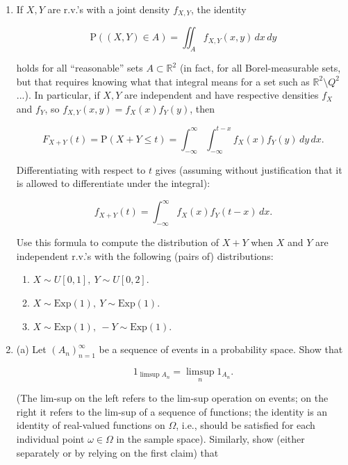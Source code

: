 \documentclass[11pt]{report}
\newcommand{\R}{\mathbb{R}}
\theoremstyle{plain}
\theoremstyle{definition}
\begin{document}
\begin{enumerate}[label=\arabic*.]
(c) Let $X_1, X_2, \ldots$ be a sequence of
independent r.v.'s, all of them having distribution
$\textrm{Exp}(1)$. For each $n\ge1$ denote

\[
M_n = \max(X_1,X_2,\ldots,X_n) - \log n.
\]

\noindent Compute for each $n$ the distribution function of
$M_n$, and find the limit (if it exists)

\[
F(x) = \lim_{n\to\infty} F_{M_n}(x).
\]

\item If $X,Y$ are r.v.'s with a joint density $f_{X,Y}$,
the identity

\[
\mathrm{P}((X,Y) \in A) = \iint_A f_{X,Y}(x,y)\,dx\,dy
\]

\noindent holds for all ``reasonable'' sets $A\subset \R^2$ (in
fact, for all Borel-measurable sets, but that requires
knowing what that integral means for a set such as
$\R^2\setminus Q^2$...). In particular, if $X,Y$ are
independent and have respective densities $f_X$ and
$f_Y$, so $f_{X,Y}(x,y)=f_X(x)f_Y(y)$, then

\[
F_{X+Y}(t) = \mathrm{P}(X+Y \le t) = \int_{-\infty}^\infty \int_{-\infty}^{t-x} f_{X}(x)f_Y(y)\,dy\,dx.
\]

\noindent Differentiating with respect to $t$ gives (assuming
without justification that it is allowed to
differentiate under the integral):

\[
f_{X+Y}(t) = \int_{-\infty}^\infty f_X(x)f_Y(t-x)\,dx.
\]

\noindent Use this formula to compute the distribution of $X+Y$
when $X$ and $Y$ are independent r.v.'s with the
following (pairs of) distributions:

\begin{enumerate}[label=\arabic*.]
\item $X \sim U[0,1],\ Y \sim U[0,2]$.

\item $X \sim \textrm{Exp}(1),\ Y \sim \textrm{Exp}(1)$.

\item $X \sim \textrm{Exp}(1),\  -Y \sim \textrm{Exp}(1)$.
\end{enumerate}

\item (a) Let $(A_n)_{n=1}^\infty$ be a sequence of events
in a probability space. Show that

\[
1_{\limsup A_n} = \limsup_n 1_{A_n}.
\]

\noindent (The lim-sup on the left refers to the lim-sup
operation on events; on the right it refers to the
lim-sup of a sequence of functions; the identity is an
identity of real-valued functions on $\Omega$, i.e.,
should be satisfied for each individual point
$\omega \in \Omega$ in the sample space). Similarly,
show (either separately or by relying on the first
claim) that


\end{enumerate}
\end{document}
